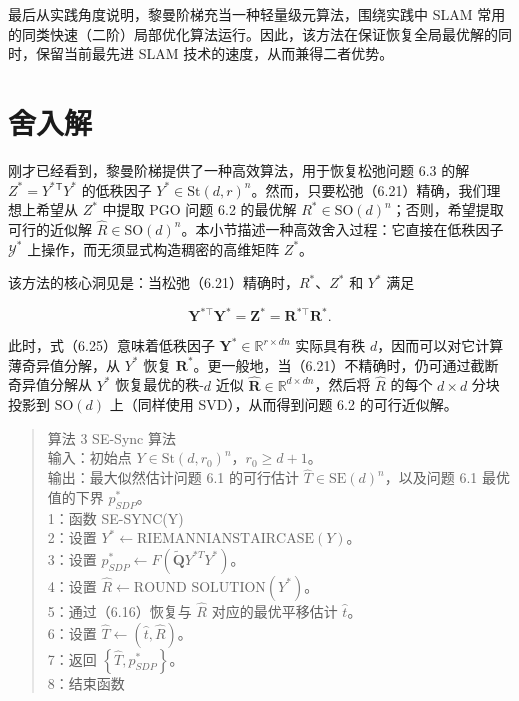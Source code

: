最后从实践角度说明，黎曼阶梯充当一种轻量级元算法，围绕实践中 SLAM 常用的同类快速（二阶）局部优化算法运行。因此，该方法在保证恢复全局最优解的同时，保留当前最先进 SLAM 技术的速度，从而兼得二者优势。

\section{舍入解}

刚才已经看到，黎曼阶梯提供了一种高效算法，用于恢复松弛问题 6.3 的解 $Z ^ { * } = Y ^ { * } { } ^ { \mathsf { T } } Y ^ { * }$ 的低秩因子 $Y ^ { * } \in \mathrm { S t } ( d , r ) ^ { n }$。然而，只要松弛（6.21）精确，我们理想上希望从 $Z ^ { * }$ 中提取 PGO 问题 6.2 的最优解 $R ^ { * } \in \mathrm { S O } ( d ) ^ { n }$；否则，希望提取可行的近似解 $\hat { R } \in \mathrm { S O } ( d ) ^ { n }$。本小节描述一种高效舍入过程：它直接在低秩因子 $\mathcal{Y} ^ { * }$ 上操作，而无须显式构造稠密的高维矩阵 $Z ^ { * }$。

该方法的核心洞见是：当松弛（6.21）精确时，$R ^ { * }$、$Z ^ { * }$ 和 $Y ^ { * }$ 满足

\begin{equation}
\boldsymbol {Y} ^ {* \top} \boldsymbol {Y} ^ {*} = \boldsymbol {Z} ^ {*} = \boldsymbol {R} ^ {* \top} \boldsymbol {R} ^ {*} .\tag{6.25}
\end{equation}

此时，式（6.25）意味着低秩因子 $\pmb { Y } ^ { * } \in \mathbb { R } ^ { r \times d n }$ 实际具有秩 $d$，因而可以对它计算薄奇异值分解，从 $Y ^ { * }$ 恢复 $\pmb { R } ^ { * }$。更一般地，当（6.21）不精确时，仍可通过截断奇异值分解从 $Y ^ { * }$ 恢复最优的秩-$d$ 近似 $\hat { \pmb { R } } \in \mathbb { R } ^ { d \times d n }$，然后将 $\hat { R }$ 的每个 $d \times d$ 分块投影到 $\mathrm { SO } ( d )$ 上（同样使用 SVD），从而得到问题 6.2 的可行近似解。

\begin{quote}
\small
算法 3 SE-Sync 算法\\
输入：初始点 $Y \in \text{St}(d, r_0)^n$，$r_0 \geq d + 1$。\\
输出：最大似然估计问题 6.1 的可行估计 $\hat{T} \in \text{SE}(d)^n$，以及问题 6.1 最优值的下界 $p_{SDP}^*$。\\
1：函数 SE-SYNC(Y)\\
2：设置 $Y^* \leftarrow \text{RIEMANNIANSTAIRCASE}(Y)$。\\
3：设置 $p_{SDP}^* \leftarrow F(\tilde{\boldsymbol{Q}}Y^{*T}Y^*)$。\\
4：设置 $\hat{R} \leftarrow \text{ROUND SOLUTION}(Y^*)$。\\
5：通过（6.16）恢复与 $\hat{R}$ 对应的最优平移估计 $\hat{t}$。\\
6：设置 $\hat{T} \leftarrow (\hat{t}, \hat{R})$。\\
7：返回 $\left\{\hat{T}, p_{SDP}^*\right\}$。\\
8：结束函数\\
\end{quote}

